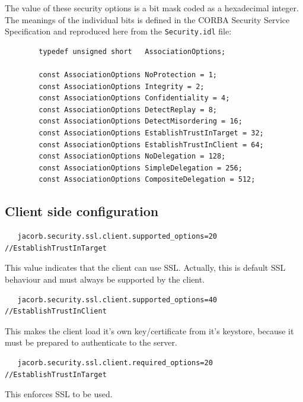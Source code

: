 The  value  of  these security  options  is  a  bit  mask coded  as  a
hexadecimal integer. The meanings of the individual bits is defined in
the CORBA Security Service  Specification and reproduced here from the
{\tt Security.idl} file:

\begin{verbatim}
        typedef unsigned short   AssociationOptions;

        const AssociationOptions NoProtection = 1;
        const AssociationOptions Integrity = 2;
        const AssociationOptions Confidentiality = 4;
        const AssociationOptions DetectReplay = 8;
        const AssociationOptions DetectMisordering = 16;
        const AssociationOptions EstablishTrustInTarget = 32;
        const AssociationOptions EstablishTrustInClient = 64;
        const AssociationOptions NoDelegation = 128;
        const AssociationOptions SimpleDelegation = 256;
        const AssociationOptions CompositeDelegation = 512;
\end{verbatim}


\subsection{Client side configuration}

\begin{verbatim}
   jacorb.security.ssl.client.supported_options=20 //EstablishTrustInTarget
\end{verbatim}
This value indicates that the client can use SSL. Actually, this is default
SSL behaviour and must always be supported by the client.

\begin{verbatim}
   jacorb.security.ssl.client.supported_options=40 //EstablishTrustInClient
\end{verbatim}
This makes the client load it's own key/certificate from it's
keystore, because it must be prepared to authenticate to the server.

\begin{verbatim}
   jacorb.security.ssl.client.required_options=20 //EstablishTrustInTarget
\end{verbatim}
This enforces SSL to be used.

